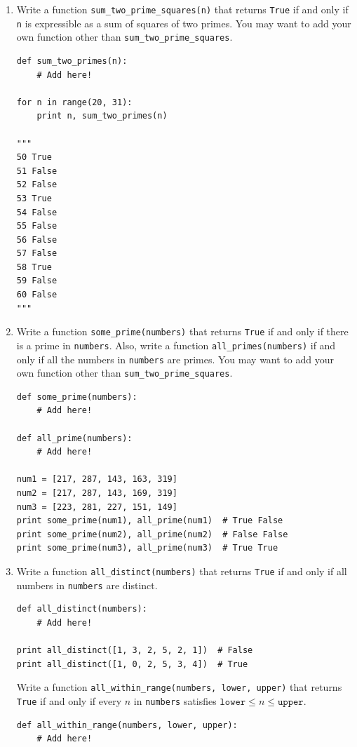\documentclass[../main.tex]{subfiles}
\begin{document}
\begin{enumerate}
\item Write a function \texttt{sum\_two\_prime\_squares(n)} that returns \texttt{True} if and only if \texttt{n} is expressible as a sum of squares of two primes.
You may want to add your own function other than \texttt{sum\_two\_prime\_squares}.
\begin{verbatim}
def sum_two_primes(n):
	# Add here!
	
for n in range(20, 31):
	print n, sum_two_primes(n)

"""
50 True
51 False
52 False
53 True
54 False
55 False
56 False
57 False
58 True
59 False
60 False
"""
\end{verbatim}

\item Write a function \texttt{some\_prime(numbers)} that returns \texttt{True} if and only if there is a prime in \texttt{numbers}.
Also, write a function \texttt{all\_primes(numbers)} if and only if all the numbers in \texttt{numbers} are primes.
You may want to add your own function other than \texttt{sum\_two\_prime\_squares}.
\begin{verbatim}
def some_prime(numbers):
	# Add here!

def all_prime(numbers):
	# Add here!
               
num1 = [217, 287, 143, 163, 319]
num2 = [217, 287, 143, 169, 319]
num3 = [223, 281, 227, 151, 149]
print some_prime(num1), all_prime(num1)  # True False
print some_prime(num2), all_prime(num2)  # False False
print some_prime(num3), all_prime(num3)  # True True
\end{verbatim}

\item Write a function \texttt{all\_distinct(numbers)} that returns \texttt{True} if and only if all numbers in \texttt{numbers} are distinct.
\begin{verbatim}
def all_distinct(numbers):
	# Add here!

print all_distinct([1, 3, 2, 5, 2, 1])  # False
print all_distinct([1, 0, 2, 5, 3, 4])  # True
\end{verbatim}
Write a function \texttt{all\_within\_range(numbers, lower, upper)} that returns \texttt{True} if and only if every $n$ in \texttt{numbers} satisfies $\texttt{lower} \leq n \leq \texttt{upper}$.
\begin{verbatim}
def all_within_range(numbers, lower, upper):
	# Add here!


\end{verbatim}
\end{enumerate}
\end{document}
